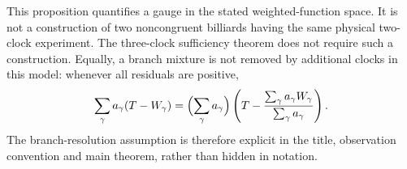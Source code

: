 This proposition quantifies a gauge in the stated weighted-function
space.  It is not a construction of two noncongruent billiards having
the same physical two-clock experiment.  The three-clock sufficiency
theorem does not require such a construction.  Equally, a branch mixture
is not removed by additional clocks in this model: whenever all residuals
are positive,
\[
 \sum_\gamma a_\gamma(T-W_\gamma)
 =\Bigl(\sum_\gamma a_\gamma\Bigr)
       \left(T-\frac{\sum_\gamma a_\gamma W_\gamma}
                       {\sum_\gamma a_\gamma}\right).
\]
The branch-resolution assumption is therefore explicit in the title,
observation convention and main theorem, rather than hidden in notation.
